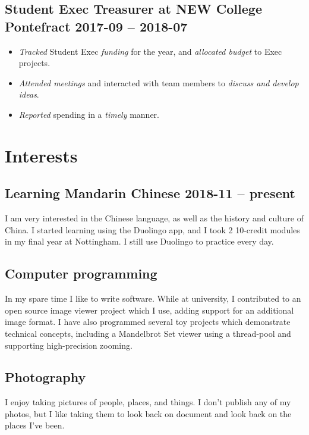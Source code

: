 \documentclass[cv.tex]{subfiles}
\begin{document}
    \subsection{Student Exec Treasurer at NEW College Pontefract
    \hfill 2017-09 -- 2018-07}
        \begin{itemize}
            \item \emph{Tracked} Student Exec \emph{funding} for the year,
                and \emph{allocated budget} to Exec projects.
            \item \emph{Attended
                meetings} and interacted with team members to
                \emph{discuss and develop ideas}.
            \item \emph{Reported} spending in a \emph{timely} manner.
        \end{itemize}

\section{Interests}
\subsection{Learning Mandarin Chinese \hfill 2018-11 -- present}
I am very interested in the Chinese language, as well as the history and
culture of China. I started learning using the Duolingo app, and I took 2
10-credit modules in my final year  at Nottingham. I still use Duolingo to
practice every day.

\subsection{Computer programming}
In my spare time I like to write software. While at university, I contributed
to an open source image viewer project which I use, adding support for an
additional image format. I have also programmed several toy projects which
demonstrate technical concepts, including a Mandelbrot Set viewer using a
thread-pool and supporting high-precision zooming.

\subsection{Photography}
I enjoy taking pictures of people, places, and things. I don't publish any of
my photos, but I like taking them to look back on document and look back on the
places I've been.

\end{document}
